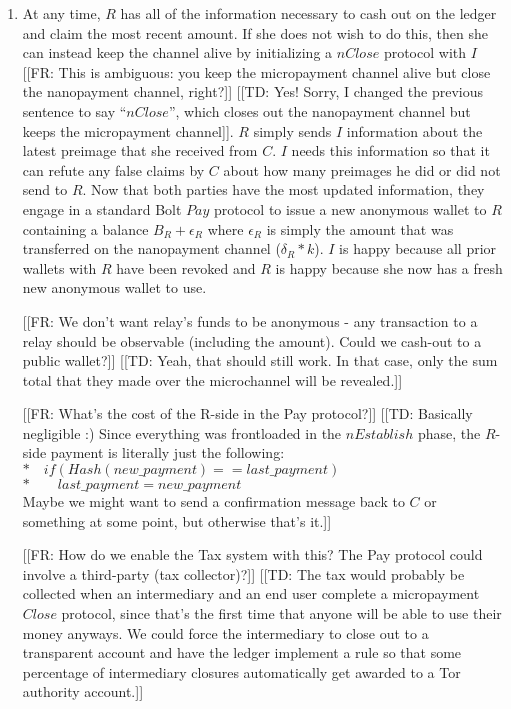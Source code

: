 \documentclass{article}
\newcommand{\flo}[1]{ {\color{blue} [[FR: #1]]}}
\newcommand{\thi}[1]{ {\color{red} [[TD: #1]]}}
\begin{document}
\begin{enumerate}
\item At any time, $R$ has all of the information necessary to cash out on the ledger and claim the most recent amount. If she does not wish to do this, then she can instead keep the channel alive by initializing a $nClose$ protocol with $I$ \flo{This is ambiguous: you keep the micropayment channel alive but close the nanopayment channel, right?} \thi{Yes! Sorry, I changed the previous sentence to say ``$nClose$'', which closes out the nanopayment channel but keeps the micropayment channel}. $R$ simply sends $I$ information about the latest preimage that she received from $C$. $I$ needs this information so that it can refute any false claims by $C$ about how many preimages he did or did not send to $R$. Now that both parties have the most updated information, they engage in a standard Bolt $Pay$ protocol to issue a new anonymous wallet to $R$ containing a balance $B_R + \epsilon_R$ where $\epsilon_R$ is simply the amount that was transferred on the nanopayment channel ($\delta_R * k$). $I$ is happy because all prior wallets with $R$ have been revoked and $R$ is happy because she now has a fresh new anonymous wallet to use.

\flo{We don't want relay's funds to be anonymous - any transaction to a relay should be observable (including the amount). Could we cash-out to a public wallet?}
\thi{Yeah, that should still work. In that case, only the sum total that they made over the microchannel will be revealed.}

\flo{What's the cost of the R-side in the Pay protocol?}
\thi{Basically negligible :) Since everything was frontloaded in the $nEstablish$ phase, the $R$-side payment is literally just the following: \\
$*\quad if(Hash(new\_payment) == last\_payment)$ \\
$*\qquad last\_payment = new\_payment$ \\
Maybe we might want to send a confirmation message back to $C$ or something at some point, but otherwise that's it.}

\flo{How do we enable the Tax system with this? The Pay protocol could involve a third-party (tax collector)?}
\thi{The tax would probably be collected when an intermediary and an end user complete a micropayment $Close$ protocol, since that's the first time that anyone will be able to use their money anyways. We could force the intermediary to close out to a transparent account and have the ledger implement a rule so that some percentage of intermediary closures automatically get awarded to a Tor authority account.}


\end{enumerate}
\end{document}
